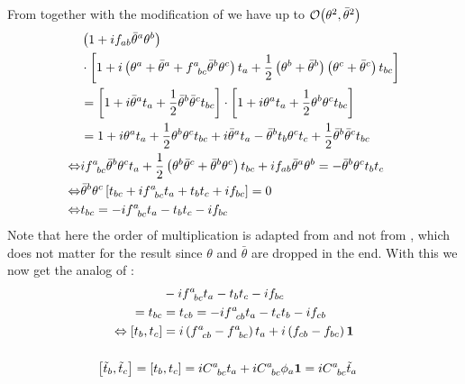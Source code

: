 \subsubsection{ }
From  together with the modification of  we have up to $\order{\theta^2,\bar{\theta}^2}$
\begin{align*} 
	&\left(1+i f_{ab}\bar{\theta}^a\theta^b\right)\\
	&\cdot\left[1+i\left(\theta^a+\bar{\theta}^a+f^a_{\hphantom{a} bc}\bar{\theta}^b\theta^c\right)t_a+
	\dfrac{1}{2}\left(\theta^b+\bar{\theta}^b\right)\left(\theta^c+\bar{\theta}^c\right)t_{bc}\right]\\
	&=\left[1+i\bar{\theta}^a t_a+\dfrac{1}{2}\bar{\theta}^b\bar{\theta}^c t_{bc}\right]\cdot\left[1+i{\theta}^a t_a+\dfrac{1}{2}{\theta}^b{\theta}^c t_{bc}\right]\\
	&=1+i{\theta}^a t_a+\dfrac{1}{2}{\theta}^b{\theta}^c t_{bc}+i\bar{\theta}^a t_a-\bar{\theta}^b t_b \theta^c t_c+\dfrac{1}{2}\bar{\theta}^b\bar{\theta}^c t_{bc}\\
	\Leftrightarrow &i f^a_{\hphantom{a} bc}\bar{\theta}^b\theta^c t_a + \dfrac{1}{2}\left(\theta^b \bar{\theta}^c+ \bar{\theta}^b\theta^c\right)t_{bc} +i f_{ab}\bar{\theta}^a\theta^b=-\bar{\theta}^b  \theta^c t_b t_c\\
	\Leftrightarrow&\bar{\theta}^b\theta^c\left[t_{bc}+ i f^a_{\hphantom{a} bc} t_a+t_b t_c+i f_{bc}\right]=0\\
	\Leftrightarrow& t_{bc}=- i f^a_{\hphantom{a} bc} t_a-t_b t_c-i f_{bc}
\end{align*}
Note that here the order of multiplication is adapted from  and not from , which does not matter for the result since $\theta$ and $\bar{\theta}$ are dropped in the end. With this we now get the analog of :
\begin{align*} 
	&- i f^a_{\hphantom{a} bc} t_a-t_b t_c -i f_{bc}\\
	=t_{bc}&=t_{cb} = - i f^a_{\hphantom{a} cb} t_a-t_c t_b-i f_{cb}\\
	\Leftrightarrow\commutator{t_b}{t_c}&=i\left(f^a_{\hphantom{a} cb}-f^a_{\hphantom{a} bc}\right)t_a+i\left(f_{cb}-f_{bc}\right)\identity
\end{align*}

\subsubsection{ }
\begin{align*} 
	\commutator{\tilde{t}_b}{\tilde{t}_c}&=\commutator{t_b}{t_c}=iC^a_{\hphantom{a}bc} t_a+iC^a_{\hphantom{a}bc}\phi_a \identity=iC^a_{\hphantom{a}bc}\tilde{t}_a
\end{align*}

